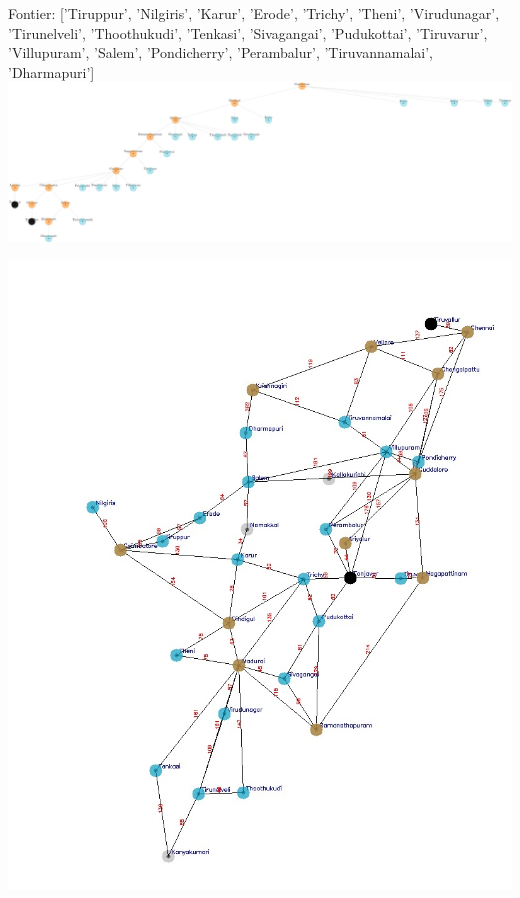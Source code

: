 \documentclass[xcolor=table]{beamer}
\begin{document}
\begin{frame}
  { \tiny Fontier: ['Tiruppur', 'Nilgiris', 'Karur', 'Erode', 'Trichy', 'Theni', 'Virudunagar', 'Tirunelveli', 'Thoothukudi', 'Tenkasi', 'Sivagangai', 'Pudukottai', 'Tiruvarur', 'Villupuram', 'Salem', 'Pondicherry', 'Perambalur', 'Tiruvannamalai', 'Dharmapuri']}
  \includegraphics[width=1\textwidth]{../DFSNodes/17-1.png}
  \begin{center}
    \includegraphics[height=0.45\textheight]{../DFSoutput/tamilDFS15.jpg}
  \end{center}
\end{frame}
\end{document}
